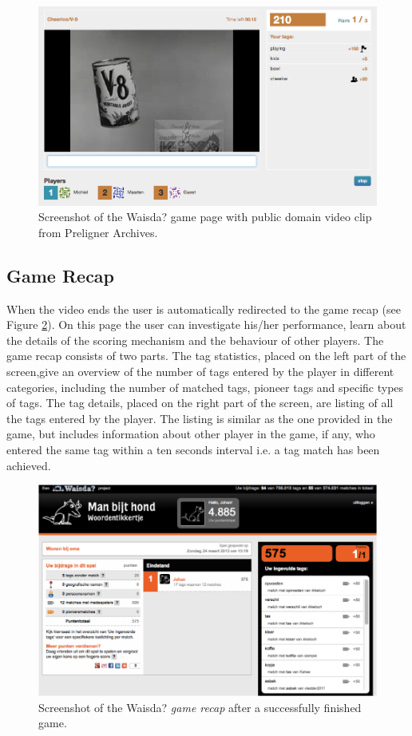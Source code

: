 \begin{figure}[t!]
\centering
\includegraphics[width=\columnwidth]{figs/game} 
\caption{Screenshot of the Waisda? game page with public domain video clip from Preligner Archives.}
\label{game}
\end{figure}

\subsection{Game Recap}

When the video ends the user is automatically redirected to the game recap (see Figure \ref{recap}). On this page the user can investigate his/her performance, learn about the details of the scoring mechanism and the behaviour of other players. The game recap consists of two parts. The tag statistics, placed on the left part of the screen,give an overview of the number of tags entered by the player in different categories, including the number of matched tags, pioneer tags and specific types of tags. The tag details, placed on the right part of the screen, are listing of all the tags entered by the player. The listing is similar as the one provided in the game, but includes information about other player in the game, if any, who entered the same tag within a ten seconds interval i.e. a tag match has been achieved.

\begin{figure}[t!]
\centering
\includegraphics[width=\columnwidth]{figs/recap} 
\caption{Screenshot of the Waisda? \textit{game recap} after a successfully finished game.}
\label{recap}
\end{figure}

